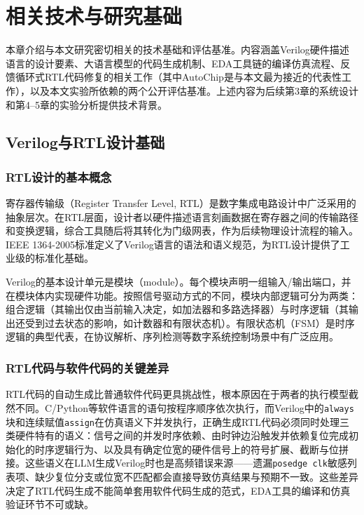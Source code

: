 \chapter{相关技术与研究基础}

本章介绍与本文研究密切相关的技术基础和评估基准。内容涵盖Verilog硬件描述语言的设计要素、大语言模型的代码生成机制、EDA工具链的编译仿真流程、反馈循环式RTL代码修复的相关工作（其中AutoChip是与本文最为接近的代表性工作），以及本文实验所依赖的两个公开评估基准。上述内容为后续第3章的系统设计和第4--5章的实验分析提供技术背景。

\section{Verilog与RTL设计基础}

\subsection{RTL设计的基本概念}

寄存器传输级（Register Transfer Level, RTL）是数字集成电路设计中广泛采用的抽象层次\cite{ieee1364}。在RTL层面，设计者以硬件描述语言刻画数据在寄存器之间的传输路径和变换逻辑，综合工具随后将其转化为门级网表，作为后续物理设计流程的输入。IEEE 1364-2005标准\cite{ieee1364}定义了Verilog语言的语法和语义规范，为RTL设计提供了工业级的标准化基础。

Verilog的基本设计单元是模块（module）。每个模块声明一组输入/输出端口，并在模块体内实现硬件功能。按照信号驱动方式的不同，模块内部逻辑可分为两类：组合逻辑（其输出仅由当前输入决定，如加法器和多路选择器）与时序逻辑（其输出还受到过去状态的影响，如计数器和有限状态机）。有限状态机（FSM）是时序逻辑的典型代表，在协议解析、序列检测等数字系统控制场景中有广泛应用。

\subsection{RTL代码与软件代码的关键差异}

RTL代码的自动生成比普通软件代码更具挑战性，根本原因在于两者的执行模型截然不同。C/Python等软件语言的语句按程序顺序依次执行，而Verilog中的\texttt{always}块和连续赋值\texttt{assign}在仿真语义下并发执行，正确生成RTL代码必须同时处理三类硬件特有的语义：信号之间的并发时序依赖、由时钟边沿触发并依赖复位完成初始化的时序逻辑行为、以及具有确定位宽的硬件信号上的符号扩展、截断与位拼接。这些语义在LLM生成Verilog时也是高频错误来源——遗漏\texttt{posedge clk}敏感列表项、缺少复位分支或位宽不匹配都会直接导致仿真结果与预期不一致。这些差异决定了RTL代码生成不能简单套用软件代码生成的范式，EDA工具的编译和仿真验证环节不可或缺。


